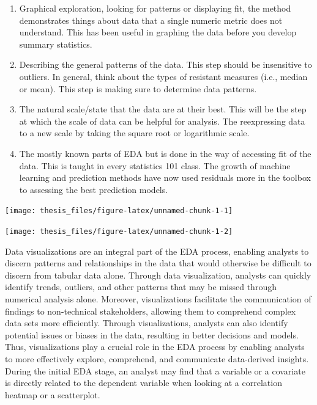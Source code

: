 \documentclass[print]{nuthesis}
\begin{document}
\begin{enumerate}
\def\labelenumi{\arabic{enumi}.}
\item
  Graphical exploration, looking for patterns or displaying fit, the method demonstrates things about data that a single numeric metric does not understand.
  This has been useful in graphing the data before you develop summary statistics.
\item
  Describing the general patterns of the data.
  This step should be insensitive to outliers.
  In general, think about the types of resistant measures (i.e., median or mean).
  This step is making sure to determine data patterns.
\item
  The natural scale/state that the data are at their best.
  This will be the step at which the scale of data can be helpful for analysis.
  The reexpressing data to a new scale by taking the square root or logarithmic scale.
\item
  The mostly known parts of EDA but is done in the way of accessing fit of the data.
  This is taught in every statistics 101 class.
  The growth of machine learning and prediction methods have now used residuals more in the toolbox to assessing the best prediction models.
\end{enumerate}

\begin{center}\texttt{[image: thesis\_files/figure-latex/unnamed-chunk-1-1]} \end{center}

\begin{center}\texttt{[image: thesis\_files/figure-latex/unnamed-chunk-1-2]} \end{center}

Data visualizations are an integral part of the EDA process, enabling analysts to discern patterns and relationships in the data that would otherwise be difficult to discern from tabular data alone.
Through data visualization, analysts can quickly identify trends, outliers, and other patterns that may be missed through numerical analysis alone.
Moreover, visualizations facilitate the communication of findings to non-technical stakeholders, allowing them to comprehend complex data sets more efficiently.
Through visualizations, analysts can also identify potential issues or biases in the data, resulting in better decisions and models.
Thus, visualizations play a crucial role in the EDA process by enabling analysts to more effectively explore, comprehend, and communicate data-derived insights.
During the initial EDA stage, an analyst may find that a variable or a covariate is directly related to the dependent variable when looking at a correlation heatmap or a scatterplot.
\end{document}
